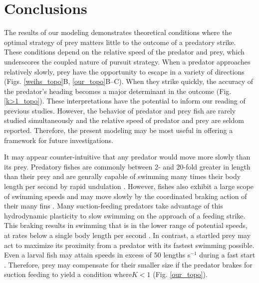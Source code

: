 \documentclass[12pt]{article}
\begin{document}
\section{Conclusions}

The results of our modeling demonstrates theoretical conditions where the optimal strategy of prey matters little to the outcome of a predatory strike. These conditions depend on the relative speed of the predator and prey, which underscores the coupled nature of pursuit strategy. 
When a predator approaches relatively slowly, prey have the opportunity to escape in a variety of directions (Figs. \ref{weihs_topo}B, \ref{our_topo}B--C). When they strike quickly, the accuracy of the predator's heading becomes a major determinant in the outcome (Fig. \ref{k>1_topo}). These interpretations have the potential to inform our reading of previous studies. 
However, the behavior of predator and prey fish are rarely studied simultaneously and the relative speed of predator and prey are seldom reported. Therefore, the present modeling may be most useful in offering a framework for future investigations.

It may appear counter-intuitive that any predator would move more slowly than its prey. Predatory fishes are commonly between 2- and 20-fold greater in length than their prey \citep{Fuiman:1994ef} and are genrally capable of swimming many times their body length per second by rapid undulation \citep{Bainbridge:1958uja}. 
However, fishes also exhibit a large scope of swimming speeds and may move slowly by the coordinated braking action of their many fins \citep{Videler:1981zz, McHenry:2005tc}. Many suction-feeding predators take advantage of this hydrodynamic plasticity to slow swimming on the approach of a feeding strike. This braking results in swimming that is in the lower range of potential speeds, at rates below a single body length per second \citep{Higham:2005iu,Higham:2007go}. 
In contrast, a startled prey may act to maximize its proximity from a predator with its fastest swimming possible. Even a larval fish may attain speeds in excess of 50 lengths s$^{-1}$ during a fast start \citep{Muller:2004hp}. Therefore, prey may compensate for their smaller size if the predator brakes for suction feeding to yield a condition where$K<1$ (Fig. \ref{our_topo}). 
\end{document}
